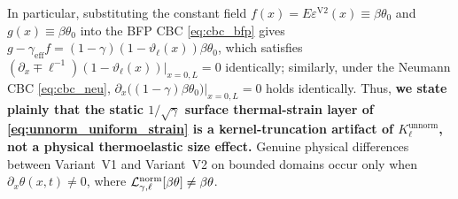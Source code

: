 In particular, substituting the constant field $f(x) = E\varepsilon^{\mathrm{V2}}(x) \equiv \beta\theta_0$ and $g(x) \equiv \beta\theta_0$ into the BFP CBC \eqref{eq:cbc_bfp} gives $g - \gamma_{\mathrm{eff}}f = (1-\gamma)(1-\vartheta_\ell(x))\beta\theta_0$, which satisfies $(\partial_x \mp \ell^{-1})(1-\vartheta_\ell(x))\big|_{x=0,L} = 0$ identically; similarly, under the Neumann CBC \eqref{eq:cbc_neu}, $\partial_x\big((1-\gamma)\beta\theta_0\big)\big|_{x=0,L} = 0$ holds identically. Thus, \textbf{we state plainly that the static $1/\sqrt{\gamma}$ surface thermal-strain layer of \eqref{eq:unnorm_uniform_strain} is a kernel-truncation artifact of $K_\ell^{\mathrm{unnorm}}$, not a physical thermoelastic size effect.} Genuine physical differences between Variant~V1 and Variant~V2 on bounded domains occur only when $\partial_x\theta(x,t) \neq 0$, where $\mathcal{L}_{\gamma,\ell}^{\mathrm{norm}}[\beta\theta] \neq \beta\theta$.
